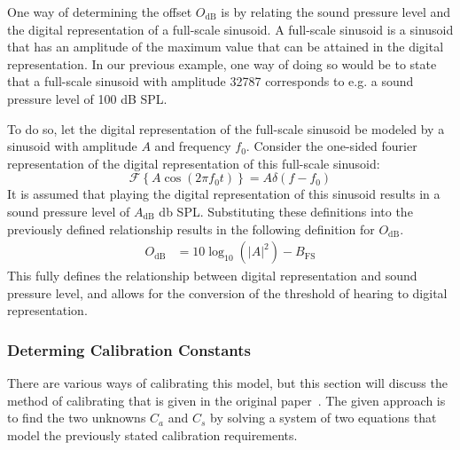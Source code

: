 One way of determining the offset $O_\text{dB}$ is by relating the sound pressure level and the digital representation of a full-scale sinusoid.
A full-scale sinusoid is a sinusoid that has an amplitude of the maximum value that can be attained in the digital representation.
In our previous example, one way of doing so would be to state that a full-scale sinusoid with amplitude 32787 corresponds to 
e.g. a sound pressure level of 100 dB SPL.

To do so, let the digital representation of the full-scale sinusoid be modeled by a sinusoid with amplitude $A$ and frequency $f_0$.
Consider the one-sided fourier representation of the digital representation of this full-scale sinusoid: 
\begin{equation}
    \mathcal{F}\left\{A\cos\left(2\pi f_0 t\right)\right\} = A\delta\left(f - f_0\right)
\end{equation}
It is assumed that playing the digital representation of this sinusoid results in a sound pressure level of $A_\text{dB}$ db SPL. 
Substituting these definitions into the previously defined relationship results in the following definition for $O_\text{dB}$. 
\begin{align}
    O_\text{dB} &= 10\log_{10}\left(\left|A\right|^2\right) - B_\text{FS} 
\end{align}
This fully defines the relationship between digital representation and sound pressure level, and allows for the conversion of the threshold of hearing
to digital representation.

\subsubsection{Determing Calibration Constants}
There are various ways of calibrating this model, but this section will discuss the method of calibrating 
that is given in the original paper~\cite{van2005perceptual}.
The given approach is to find the two unknowns $C_a$ and $C_s$ by solving a system of two equations that model the previously stated calibration requirements.


